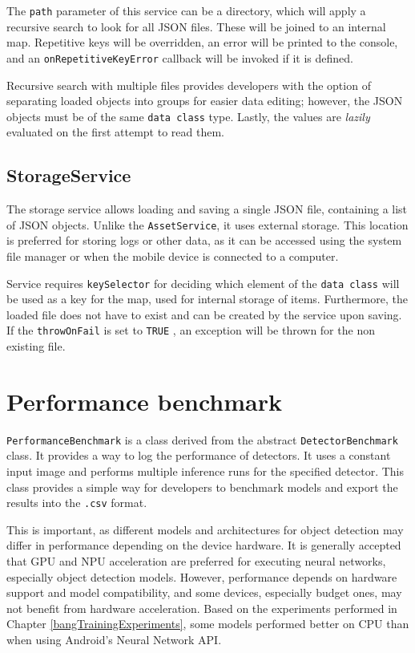 The \texttt{path} parameter of this service can be a directory, which will apply a recursive search to look for all JSON files. These will be joined to an internal map. Repetitive keys will be overridden, an error will be printed to the console, and an \texttt{onRepetitiveKeyError} callback will be invoked if it is defined.

Recursive search with multiple files provides developers with the option of separating loaded objects into groups for easier data editing; however, the JSON objects must be of the same \texttt{data class} type. Lastly, the values are \textit{lazily} evaluated on the first attempt to read them.

\subsection{StorageService}
\label{StorageService}
The storage service allows loading and saving a single JSON file, containing a list of JSON objects. Unlike the \texttt{AssetService}, it uses external storage. This location is preferred for storing logs or other data, as it can be accessed using the system file manager or when the mobile device is connected to a computer. 

Service requires \texttt{keySelector} for deciding which element of the \texttt{data class} will be used as a key for the map, used for internal storage of items.
Furthermore, the loaded file does not have to exist and can be created by the service upon saving. If the \texttt{throwOnFail} is set to \texttt{TRUE} , an exception will be thrown for the non existing file.


\section{Performance benchmark}
\texttt{PerformanceBenchmark} is a class derived from the abstract \texttt{DetectorBenchmark} class. It provides a way to log the performance of detectors. It uses a constant input image and performs multiple inference runs for the specified detector. This class provides a simple way for developers to benchmark models and export the results into the \texttt{.csv} format.

This is important, as different models and architectures for object detection may differ in performance depending on the device hardware. It is generally accepted that GPU and NPU acceleration are preferred for executing neural networks, especially object detection models. However, performance depends on hardware support and model compatibility, and some devices, especially budget ones, may not benefit from hardware acceleration. Based on the experiments performed in Chapter \ref{bangTrainingExperiments}, some models performed better on CPU than when using Android’s Neural Network API.